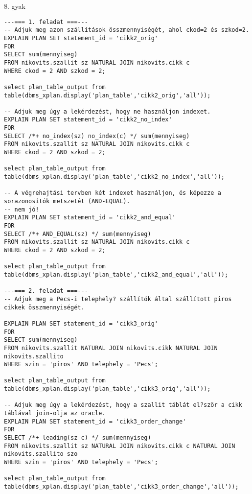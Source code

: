 \documentclass[a4paper,11.5pt, table]{article}
\begin{document}
\begin{center}
	\smallskip
	
	{\large 8. gyak}
\end{center}

\begin{lstlisting}
---=== 1. feladat ===---
-- Adjuk meg azon szállítások összmennyiségét, ahol ckod=2 és szkod=2.
EXPLAIN PLAN SET statement_id = 'cikk2_orig'
FOR
SELECT sum(mennyiseg)
FROM nikovits.szallit sz NATURAL JOIN nikovits.cikk c
WHERE ckod = 2 AND szkod = 2;

select plan_table_output from table(dbms_xplan.display('plan_table','cikk2_orig','all'));

-- Adjuk meg úgy a lekérdezést, hogy ne használjon indexet.
EXPLAIN PLAN SET statement_id = 'cikk2_no_index'
FOR
SELECT /*+ no_index(sz) no_index(c) */ sum(mennyiseg)
FROM nikovits.szallit sz NATURAL JOIN nikovits.cikk c
WHERE ckod = 2 AND szkod = 2;

select plan_table_output from table(dbms_xplan.display('plan_table','cikk2_no_index','all'));

-- A végrehajtási tervben két indexet használjon, és képezze a sorazonosítók metszetét (AND-EQUAL).
-- nem jó!
EXPLAIN PLAN SET statement_id = 'cikk2_and_equal'
FOR
SELECT /*+ AND_EQUAL(sz) */ sum(mennyiseg)
FROM nikovits.szallit sz NATURAL JOIN nikovits.cikk c
WHERE ckod = 2 AND szkod = 2;

select plan_table_output from table(dbms_xplan.display('plan_table','cikk2_and_equal','all')); 

---=== 2. feladat ===---
-- Adjuk meg a Pecs-i telephely? szállítók által szállított piros cikkek összmennyiségét.

EXPLAIN PLAN SET statement_id = 'cikk3_orig'
FOR
SELECT sum(mennyiseg)
FROM nikovits.szallit NATURAL JOIN nikovits.cikk NATURAL JOIN nikovits.szallito
WHERE szin = 'piros' AND telephely = 'Pecs';

select plan_table_output from table(dbms_xplan.display('plan_table','cikk3_orig','all')); 

-- Adjuk meg úgy a lekérdezést, hogy a szallit táblát el?ször a cikk táblával join-olja az oracle.
EXPLAIN PLAN SET statement_id = 'cikk3_order_change'
FOR
SELECT /*+ leading(sz c) */ sum(mennyiseg)
FROM nikovits.szallit sz NATURAL JOIN nikovits.cikk c NATURAL JOIN nikovits.szallito szo
WHERE szin = 'piros' AND telephely = 'Pecs';

select plan_table_output from table(dbms_xplan.display('plan_table','cikk3_order_change','all')); 


\end{lstlisting}
\end{document}
